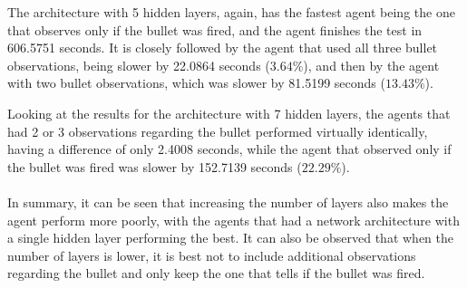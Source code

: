 The architecture with 5 hidden layers, again, has the fastest agent being the one that observes only if the bullet was fired, and the agent finishes the test in 606.5751 seconds. It is closely followed by the agent that used all three bullet observations, being slower by 22.0864 seconds ($3.64\%$), and then by the agent with two bullet observations, which was slower by 81.5199 seconds ($13.43\%$).

Looking at the results for the architecture with 7 hidden layers, the agents that had 2 or 3 observations regarding the bullet performed virtually identically, having a difference of only 2.4008 seconds, while the agent that observed only if the bullet was fired was slower by 152.7139 seconds ($22.29\%$).

\paragraph{}
In summary, it can be seen that increasing the number of layers also makes the agent perform more poorly, with the agents that had a network architecture with a  single hidden layer performing the best. It can also be observed that when the number of layers is lower, it is best not to include additional observations regarding the bullet and only keep the one that tells if the bullet was fired.

